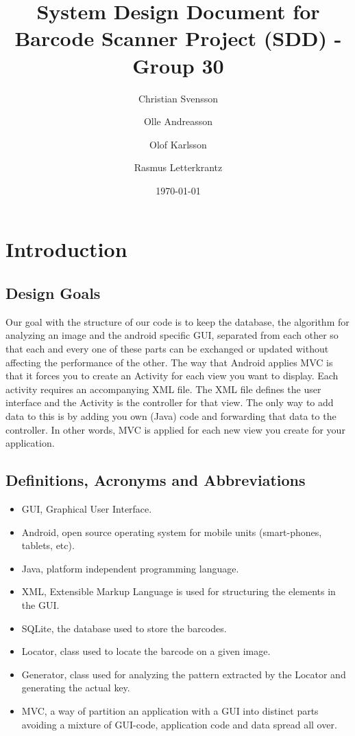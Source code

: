 \documentclass{report}
\begin{document}
\title{System Design Document for Barcode Scanner Project (SDD) - Group 30}
\author{
    Christian Svensson\\
    \and
    Olle Andreasson\\
    \and
    Olof Karlsson\\
    \and
    Rasmus Letterkrantz
}
\date{\today}
\maketitle

\tableofcontents

\chapter{Introduction}

\section{Design Goals}
Our goal with the structure of our code is to keep the database, the algorithm for analyzing an image and the android specific GUI, separated from each other so that each and every one of these parts can be exchanged or updated without affecting the performance of the other. 
The way that Android applies MVC\cite{website:mvc} is that it forces you to create an Activity for each view you want to display. Each activity requires an accompanying XML file. The XML file defines the user interface and the Activity is the controller for that view. The only way to add data to this is by adding you own (Java) code and forwarding that data to the controller. In other words, MVC is applied for each new view you create for your application.

\pagebreak

\section{Definitions, Acronyms and Abbreviations}

\begin{itemize}
    \item{GUI}, Graphical User Interface.
    \item{Android}, open source operating system for mobile units (smart-phones, tablets, etc).
    \item{Java}, platform independent programming language.
    \item{XML}, Extensible Markup Language is used for structuring the elements in the GUI.
    \item{SQLite}, the database used to store the barcodes.
    \item{Locator}, class used to locate the barcode on a given image.
    \item{Generator}, class used for analyzing the pattern extracted by the Locator and generating the actual key.
    \item{MVC}, a way of partition an application with a GUI into distinct parts avoiding a mixture of GUI-code, application code and data spread all over.
\end{itemize}
\end{document}
